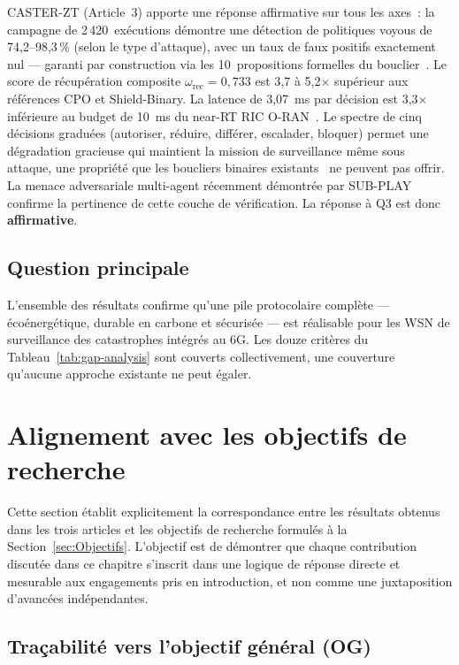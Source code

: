 CASTER-ZT (Article~3) apporte une réponse affirmative sur tous les axes~: la campagne de 2\,420~exécutions démontre une détection de politiques voyous de 74{,}2--98{,}3\,\% (selon le type d'attaque), avec un taux de faux positifs exactement nul --- garanti par construction via les 10~propositions formelles du bouclier~\cite{rose2020nist}. Le score de récupération composite $\omega_{\text{rec}} = 0{,}733$ est 3{,}7 à 5{,}2$\times$ supérieur aux références CPO et Shield-Binary. La latence de 3{,}07~ms par décision est 3{,}3$\times$ inférieure au budget de 10~ms du near-RT RIC O-RAN~\cite{polese2023oran}. Le spectre de cinq décisions graduées (autoriser, réduire, différer, escalader, bloquer) permet une dégradation gracieuse qui maintient la mission de surveillance même sous attaque, une propriété que les boucliers binaires existants~\cite{alshiekh2018shielding} ne peuvent pas offrir. La menace adversariale multi-agent récemment démontrée par SUB-PLAY~\cite{subplay_marl2025} confirme la pertinence de cette couche de vérification. La réponse à Q3 est donc \textbf{affirmative}.

\subsection{Question principale}

L'ensemble des résultats confirme qu'une pile protocolaire complète --- écoénergétique, durable en carbone et sécurisée --- est réalisable pour les WSN de surveillance des catastrophes intégrés au 6G. Les douze critères du Tableau~\ref{tab:gap-analysis} sont couverts collectivement, une couverture qu'aucune approche existante ne peut égaler.


\section{Alignement avec les objectifs de recherche}\label{sec:disc-alignement}

Cette section établit explicitement la correspondance entre les résultats obtenus dans les trois articles et les objectifs de recherche formulés à la Section~\ref{sec:Objectifs}. L'objectif est de démontrer que chaque contribution discutée dans ce chapitre s'inscrit dans une logique de réponse directe et mesurable aux engagements pris en introduction, et non comme une juxtaposition d'avancées indépendantes.

\subsection{Traçabilité vers l'objectif général (OG)}

